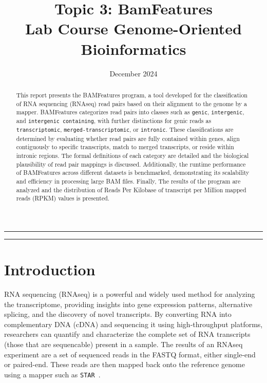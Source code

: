 \documentclass{article}
\title{Topic 3: BamFeatures\\\large Lab Course Genome-Oriented Bioinformatics}
\author{}
\date{December 2024}
\begin{document}
    \maketitle
    \renewcommand{\abstractname}{}
    \begin{abstract}
        \large

        This report presents the BAMFeatures program, a tool developed for the classification of RNA sequencing (RNAseq) read pairs based on their alignment to the genome by a mapper. BAMFeatures categorizes read pairs into classes such as \texttt{genic}, \texttt{intergenic}, and \texttt{intergenic containing}, with further distinctions for genic reads as \texttt{transcriptomic}, \texttt{merged-transcriptomic}, or \texttt{intronic}. These classifications are determined by evaluating whether read pairs are fully contained within genes, align contiguously to specific transcripts, match to merged transcripts, or reside within intronic regions. The formal definitions of each category are detailed and the biological plausibility of read pair mappings is discussed. Additionally, the runtime performance of BAMFeatures across different datasets is benchmarked, demonstrating its scalability and efficiency in processing large BAM files. Finally, The results of the program are analyzed and the distribution of Reads Per Kilobase of transcript per Million mapped reads (RPKM) values is presented.
    \end{abstract}
    \hrule
    \tableofcontents
    \vspace{10pt} %
    \hrule



    \pagebreak


    \section{Introduction}
    RNA sequencing (RNAseq) is a powerful and widely used method for analyzing the transcriptome, providing insights into gene expression patterns, alternative splicing, and the discovery of novel transcripts. By converting RNA into complementary DNA (cDNA) and sequencing it using high-throughput platforms, researchers can quantify and characterize the complete set of RNA transcripts (those that are sequencable) present in a sample. The results of an RNAseq experiment are a set of sequenced reads in the FASTQ format, either single-end or paired-end. These reads are then mapped back onto the reference genome using a mapper such as \texttt{STAR}~\cite{star}.
\end{document}
